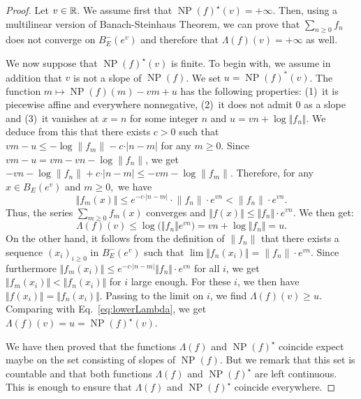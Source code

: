 \documentclass{lms}
\DeclareMathOperator{\NP}{NP}
\begin{document}
\begin{proof}
Let $v \in \mathbb R$. We assume first that $\NP(f)^\star(v) = +\infty$. Then, 
using a multilinear version of Banach-Steinhaus Theorem, we can prove 
that $\sum_{n \geq 0} f_n$ does not converge on $B_E^-(e^v)$ and 
therefore that $\Lambda(f)(v) = +\infty$ as well.

We now suppose that $\NP(f)^\star(v)$ is finite. To begin with, we 
assume in addition that $v$ is not a slope of $\NP(f)$. We set $u = 
\NP(f)^*(v)$. The function $m \mapsto \NP(f)(m) - vm + u$ has the 
following properties: (1)~it is piecewise affine and everywhere 
nonnegative, (2)~it does not admit $0$ as a slope and (3)~it vanishes at 
$x = n$ for some integer $n$ and $u = vn + \log \Vert f_n \Vert$.
We deduce from this that there exists $c>0$ such that $vm-u \leq - \log 
\lVert f_m \rVert - c \cdot \vert n-m \vert$ for any $m\geq 0$.
Since $vm-u=vm-vn-\log \lVert f_n \rVert$, we get $-vn-\log \lVert 
f_n \rVert + c \cdot \vert n-m \vert \leq -vm-\log \lVert f_m \rVert$.
Therefore, for any $x \in  B_E(e^v)$ and $m \geq 0,$ we have
$$\Vert f_m (x) \Vert \leq e^{-c \cdot \vert n-m \vert } \cdot
\lVert f_n \rVert \cdot e^{vn}< \lVert f_n \rVert \cdot e^{vn}.$$
Thus, the series $\sum_{m \geq 0} f_m(x)$ converges and $\Vert f(x) 
\Vert \leq \Vert f_n \Vert \cdot e^{vn}$. We then get:
\begin{equation}
\label{eq:lowerLambda}
\Lambda (f)(v) \leq \log \big( \Vert f_n \Vert e^{vn} \big)
= vn + \log \Vert f_n \Vert = u.
\end{equation}
On the other hand, it follows from the definition of $\lVert f_n \rVert$ 
that there exists a sequence $(x_i)_{i\geq 0}$ in $B^-_E(e^v)$ such that 
$\lim \Vert f_n (x_i) \Vert= \lVert f_n \rVert \cdot e^{vn}$. Since 
furthermore $\Vert f_m (x_i) \Vert \leq e^{-c \cdot \vert n-m \vert} 
\Vert f_n \Vert \cdot e^{vn}$ for all $i$, we get $\Vert f_m (x_i) \Vert 
< \Vert f_n (x_i) \Vert$ for $i$ large enough. For these $i$, we then 
have $\Vert f(x_i) \Vert = \Vert f_n (x_i) \Vert$. Passing to the limit 
on $i$, we find $\Lambda (f)(v) \geq u$. Comparing with 
Eq.~\eqref{eq:lowerLambda}, we get $\Lambda (f)(v) = u = 
\NP(f)^\star(v)$.

We have then proved that the functions $\Lambda(f)$ and $\NP(f)^\star$ 
coincide expect maybe on the set consisting of slopes of $\NP(f)$. But 
we remark that this set is countable and that both functions $\Lambda 
(f)$ and $\NP(f)^\star$ are left continuous. This is enough to ensure 
that $\Lambda (f)$ and $\NP(f)^\star$ coincide everywhere.
\end{proof}
\end{document}
